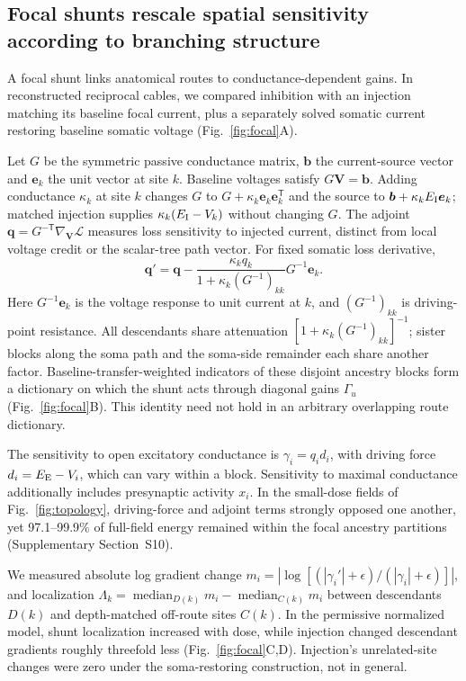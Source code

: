 \documentclass[11pt]{article}
\begin{document}
\subsection*{Focal shunts rescale spatial sensitivity according to branching structure}

A focal shunt links anatomical routes to conductance-dependent gains. In reconstructed reciprocal cables, we compared inhibition with an injection matching its baseline focal current, plus a separately solved somatic current restoring baseline somatic voltage (Fig.~\ref{fig:focal}A).

Let $G$ be the symmetric passive conductance matrix, $\bm b$ the current-source vector and $\bm e_k$ the unit vector at site $k$. Baseline voltages satisfy $G\bm V=\bm b$. Adding conductance $\kappa_k$ at site $k$ changes $G$ to $G+\kappa_k\bm e_k\bm e_k^{\mathsf T}$ and the source to $\bm b+\kappa_kE_{\rm I}\bm e_k$; matched injection supplies $\kappa_k(E_{\rm I}-V_k)$ without changing $G$. The adjoint $\bm q=G^{-\mathsf T}\nabla_{\bm V}\mathcal L$ measures loss sensitivity to injected current, distinct from local voltage credit or the scalar-tree path vector. For fixed somatic loss derivative,
\begin{equation}
\bm q'=\bm q-\frac{\kappa_kq_k}{1+\kappa_k(G^{-1})_{kk}}G^{-1}\bm e_k.
\label{eq:sherman}
\end{equation}
Here $G^{-1}\bm e_k$ is the voltage response to unit current at $k$, and $(G^{-1})_{kk}$ is driving-point resistance. All descendants share attenuation $[1+\kappa_k(G^{-1})_{kk}]^{-1}$; sister blocks along the soma path and the soma-side remainder each share another factor. Baseline-transfer-weighted indicators of these disjoint ancestry blocks form a dictionary on which the shunt acts through diagonal gains $\Gamma_u$ (Fig.~\ref{fig:focal}B). This identity need not hold in an arbitrary overlapping route dictionary.

The sensitivity to open excitatory conductance is $\gamma_i=q_id_i$, with driving force $d_i=E_{\rm E}-V_i$, which can vary within a block. Sensitivity to maximal conductance additionally includes presynaptic activity $x_i$. In the small-dose fields of Fig.~\ref{fig:topology}, driving-force and adjoint terms strongly opposed one another, yet 97.1--99.9\% of full-field energy remained within the focal ancestry partitions (Supplementary Section~S10).

We measured absolute log gradient change $m_i=|\log[(|\gamma_i'|+\epsilon)/(|\gamma_i|+\epsilon)]|$, and localization $\Lambda_k=\operatorname{median}_{D(k)}m_i-\operatorname{median}_{C(k)}m_i$ between descendants $D(k)$ and depth-matched off-route sites $C(k)$. In the permissive normalized model, shunt localization increased with dose, while injection changed descendant gradients roughly threefold less (Fig.~\ref{fig:focal}C,D). Injection's unrelated-site changes were zero under the soma-restoring construction, not in general.
\end{document}
